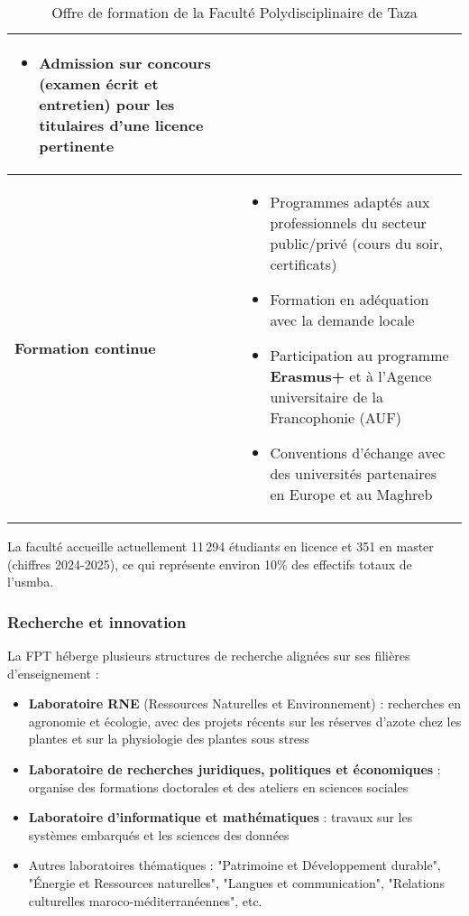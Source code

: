 \documentclass[french,12pt]{report} %
\begin{document}
\begin{table}[H]
\begin{mdframed}[style=tablestyle]
\begin{tabular}{p{3.5cm}p{10cm}}
\begin{itemize}
    \item Admission sur concours (examen écrit et entretien) pour les titulaires d'une licence pertinente
\end{itemize} \\ \midrule
\textbf{Formation continue} & 
\begin{itemize}\itemsep0em
    \item Programmes adaptés aux professionnels du secteur public/privé (cours du soir, certificats)
    \item Formation en adéquation avec la demande locale
    \item Participation au programme \textbf{Erasmus+} et à l'Agence universitaire de la Francophonie (AUF)
    \item Conventions d'échange avec des universités partenaires en Europe et au Maghreb
\end{itemize} \\ \bottomrule
\end{tabular}
\end{mdframed}
\caption{Offre de formation de la Faculté Polydisciplinaire de Taza}
\label{tab:formation-fpt}
\end{table}

La faculté accueille actuellement 11\,294 étudiants en licence et 351 en master (chiffres 2024-2025), ce qui représente environ 10\% des effectifs totaux de l'\gls{usmba}.

\subsubsection{Recherche et innovation}

La FPT héberge plusieurs structures de recherche alignées sur ses filières d'enseignement :

\begin{itemize}
    \item \textbf{Laboratoire RNE} (Ressources Naturelles et Environnement) : recherches en agronomie et écologie, avec des projets récents sur les réserves d'azote chez les plantes et sur la physiologie des plantes sous stress
    \item \textbf{Laboratoire de recherches juridiques, politiques et économiques} : organise des formations doctorales et des ateliers en sciences sociales
    \item \textbf{Laboratoire d'informatique et mathématiques} : travaux sur les systèmes embarqués et les sciences des données
    \item Autres laboratoires thématiques : "Patrimoine et Développement durable", "Énergie et Ressources naturelles", "Langues et communication", "Relations culturelles maroco-méditerranéennes", etc.
\end{itemize}
\end{document}
